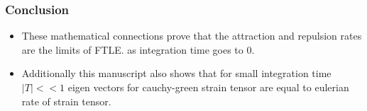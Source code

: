 \documentclass[../report.tex]{subfiles}
\begin{document}

\begin{frame}
  \frametitle{Conclusion}

  \begin{itemize}
    \item These mathematical connections prove that the attraction and repulsion rates are the limits of FTLE. as integration time goes to 0. 
    
    \item Additionally this manuscript also shows that for small integration time \(|T| << 1\) eigen vectors for cauchy-green strain tensor are equal to eulerian rate of strain tensor.
  \end{itemize}
\end{frame}
\end{document}
